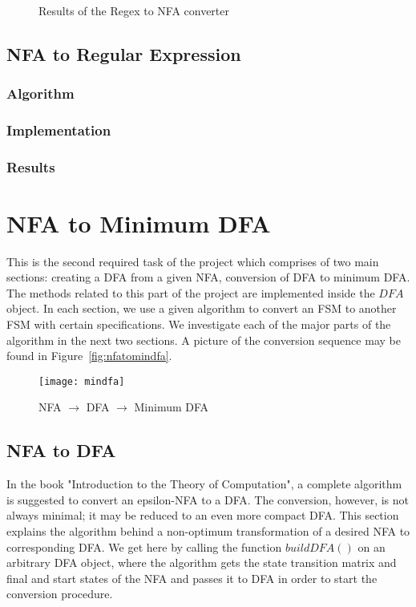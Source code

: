 \documentclass[
12pt, %
a4paper, %
oneside, %
headinclude,footinclude, %
BCOR5mm, %
]{scrartcl}
\begin{document}
\begin{figure}[tb]
	\centering
	 \quad
	 \\
	 \quad
	\caption[Results]{Results of the Regex to NFA converter}
	\label{fig:regextonfaresults}
\end{figure}

\subsection{NFA to Regular Expression}
\subsubsection{Algorithm}
\subsubsection{Implementation}
\subsubsection{Results}

\section{NFA to Minimum DFA}
This is the second required task of the project which comprises of two main sections: creating a DFA from a given NFA, conversion of DFA to minimum DFA. The methods related to this part of the project are implemented inside the $DFA$ object. In each section, we use a given algorithm to convert an FSM to another FSM with certain specifications. We investigate each of the major parts of the algorithm in the next two sections. A picture of the conversion sequence may be found in Figure~\vref{fig:nfatomindfa}.

\begin{figure}[tb]
	\centering 
	\texttt{[image: mindfa]} 
	\caption[]{NFA $ \rightarrow $ DFA $ \rightarrow $ Minimum DFA}
	\label{fig:nfatomindfa} 
\end{figure}

\subsection{NFA to DFA}
In the book "Introduction to the Theory of Computation", a complete algorithm is suggested to convert an epsilon-NFA to a DFA. The conversion, however, is not always minimal; it may be reduced to an even more compact DFA. This section explains the algorithm behind a non-optimum transformation of a desired NFA to corresponding DFA. We get here by calling the function $buildDFA()$ on an arbitrary DFA object, where the algorithm gets the state transition matrix and final and start states of the NFA and passes it to DFA in order to start the conversion procedure.
\end{document}
